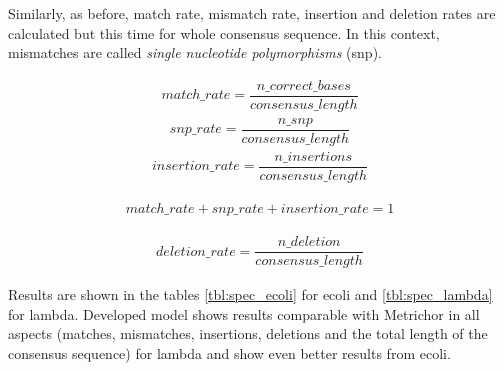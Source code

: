 \documentclass[times, utf8, diplomski, numeric, english]{fer}
\begin{document}
Similarly, as before, match rate, mismatch rate, insertion and deletion rates are calculated but this time for whole consensus sequence. In this context, mismatches are called \textit{single nucleotide polymorphisms} (snp).



\begin{equation}
\begin{gathered}
match\_rate = \dfrac{n\_correct\_bases}{consensus\_length}
\end{gathered}
\end{equation}
\begin{equation}
\begin{gathered}
snp\_rate = \dfrac{n\_snp}{consensus\_length}
\end{gathered}
\end{equation}
\begin{equation}
\begin{gathered}
insertion\_rate = \dfrac{n\_insertions}{consensus\_length}
\end{gathered}
\end{equation}

\begin{equation}
\begin{gathered}
match\_rate  + snp\_rate + insertion\_rate = 1
\end{gathered}
\end{equation}


\begin{equation}
\begin{gathered}
deletion\_rate = \dfrac{n\_deletion}{consensus\_length}
\end{gathered}
\end{equation}

Results are shown in the tables \ref{tbl:spec_ecoli}  for ecoli and \ref{tbl:spec_lambda} for lambda. 
Developed model shows results comparable with Metrichor in all aspects (matches, mismatches, insertions, deletions and the total length of the consensus sequence) for lambda and show even better results from ecoli. 
\end{document}
